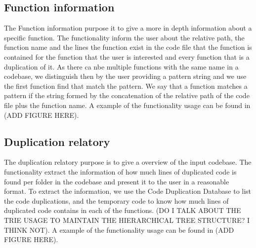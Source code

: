 \subsection{Function information}

The Function information purpose it to give a more in depth information about a specific function. The functionality inform the user
about the relative path, the function name and the lines the function exist in the code file that the function is contained for the
function that the user is interested and every function that is a duplication of it. As there ca nbe multiple functions with the 
same name in a codebase, we distinguish then by the user providing a pattern string and we use the first function find that match
the pattern. We say that a function matches a pattern if the string formed by the concatenation of the relative path of the 
code file plus the function name. 
A example of the functionality usage can be found in (ADD FIGURE HERE).

\subsection{Duplication relatory}

The duplication relatory purpose is to give a overview of the input codebase. The functionality extract the information
of how much lines of duplicated code is found per folder in the codebase and present it to the user in a reasonable format. To extract
the information, we use the Code Duplication Database to list the code duplications, and the temporary code to know how much lines of
duplicated code contains in each of the functions. (DO I TALK ABOUT THE TRIE USAGE TO MAINTAIN THE HIERARCHICAL TREE STRUCTURE? I 
THINK NOT). A example of the functionality usage can be found in (ADD FIGURE HERE).





